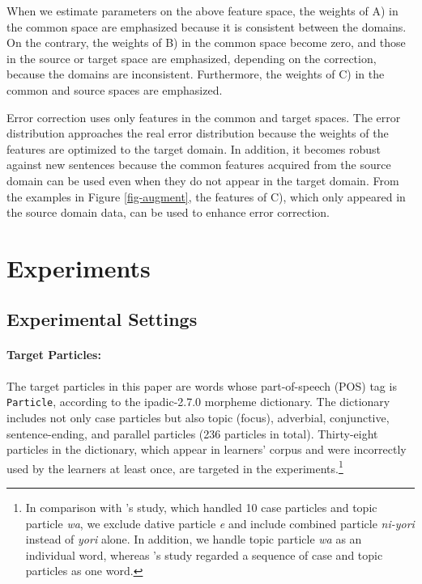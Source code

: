 \documentclass[english]{jnlp_1.4_rep}
\begin{document}
When we estimate parameters on the above feature space, the weights of
A) in the common space are emphasized because it is consistent between
the domains. On the contrary, the weights of B) in the common space
become zero, and those in the source or target space are emphasized,
depending on the correction, because the domains are
inconsistent. Furthermore, the weights of C) in the common and source
spaces are emphasized.

Error correction uses only features in the common and target
spaces. The error distribution approaches the real error distribution
because the weights of the features are optimized to the target
domain. In addition, it becomes robust against new sentences because
the common features acquired from the source domain can be used even
when they do not appear in the target domain. From the examples in
Figure \ref{fig-augment}, the features of C), which only appeared in
the source domain data, can be used to enhance error correction.


\section{Experiments}
\label{sec-experiments}

\subsection{Experimental Settings}
\label{sec-experimental-settings}

\paragraph{Target Particles: }

The target particles in this paper are words whose part-of-speech
(POS) tag is \texttt{Particle}, according to the ipadic-2.7.0 morpheme
dictionary. The dictionary includes not only case particles but also
topic (focus), adverbial, conjunctive, sentence-ending, and parallel
particles (236 particles in total). Thirty-eight particles in the
dictionary, which appear in learners' corpus and were incorrectly used
by the learners at least once, are targeted in the
experiments.\footnote{In comparison with
's study, which handled 10
case particles and topic particle \textit{wa}, we exclude dative
particle \textit{e} and include combined particle \textit{ni-yori}
instead of \textit{yori} alone. In addition, we handle topic particle
\textit{wa} as an individual word, whereas
's study regarded a sequence
of case and topic particles as one word.}
\end{document}
